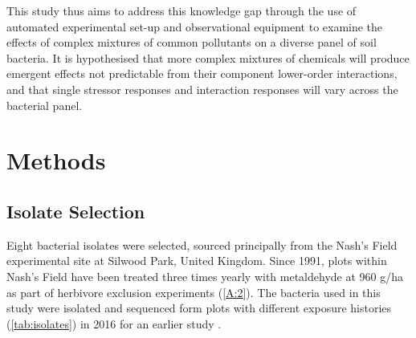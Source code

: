 \documentclass[final,1p,times]{elsarticle}
\begin{document}
This study thus aims to address this knowledge gap through the use of automated experimental set-up and observational equipment to examine the effects of complex mixtures of common pollutants on a diverse panel of soil bacteria. It is hypothesised that more complex mixtures of chemicals will produce emergent effects not predictable from their component lower-order interactions, and that single stressor responses and interaction responses will vary across the bacterial panel.

\section{Methods}
\label{S:2}
\subsection{Isolate Selection}
\label{S:2:1}

Eight bacterial isolates were selected, sourced principally from the Nash's Field experimental site at Silwood Park, United Kingdom. Since 1991, plots within Nash's Field have been treated three times yearly with metaldehyde at 960 g/ha as part of herbivore exclusion experiments \cite{Allan2011ContrastingExperiment} (\cref{A:2}). The bacteria used in this study were isolated and sequenced form plots with different exposure histories (\cref{tab:isolates}) in 2016 for an earlier study \cite{Mombrikotb2016}. 
\end{document}
